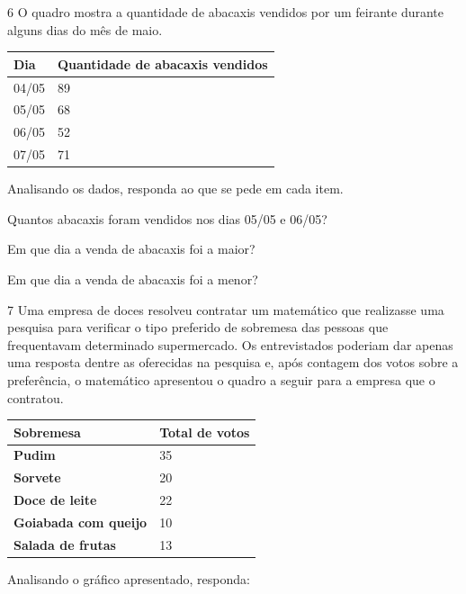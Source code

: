 \num{6} O quadro mostra a quantidade de abacaxis vendidos por um feirante
durante alguns dias do mês de maio.

\begin{longtable}[]{@{}ll@{}}
\toprule
\hline
\textbf{Dia} & \textbf{Quantidade de abacaxis vendidos}\tabularnewline
\hline
\midrule
\endhead
04/05 & 89\tabularnewline
\hline
05/05 & 68\tabularnewline
\hline
06/05 & 52\tabularnewline
\hline
07/05 & 71\tabularnewline
\bottomrule
\end{longtable}

Analisando os dados, responda ao que se pede em cada item.

\pagebreak

\begin{escolha}
\item Quantos abacaxis foram vendidos nos dias 05/05 e 06/05?\\

\item Em que dia a venda de abacaxis foi a maior?\\

\item Em que dia a venda de abacaxis foi a menor?\\
\end{escolha}

\num{7} Uma empresa de doces resolveu contratar um matemático que realizasse uma
pesquisa para verificar o tipo preferido de sobremesa das pessoas que
frequentavam determinado supermercado. Os entrevistados poderiam dar
apenas uma resposta dentre as oferecidas na pesquisa e, após contagem dos
votos sobre a preferência, o matemático apresentou o quadro a seguir
para a empresa que o contratou.

\begin{longtable}[]{@{}ll@{}}
\toprule
\hline
\textbf{Sobremesa} & \textbf{Total de votos}\tabularnewline
\hline
\midrule
\endhead
\textbf{Pudim} & 35\tabularnewline
\hline
\textbf{Sorvete} & 20\tabularnewline
\hline
\textbf{Doce de leite} & 22\tabularnewline
\hline
\textbf{Goiabada com queijo} & 10\tabularnewline
\hline
\textbf{Salada de frutas} & 13\tabularnewline
\hline
\bottomrule
\end{longtable}

Analisando o gráfico apresentado, responda:

